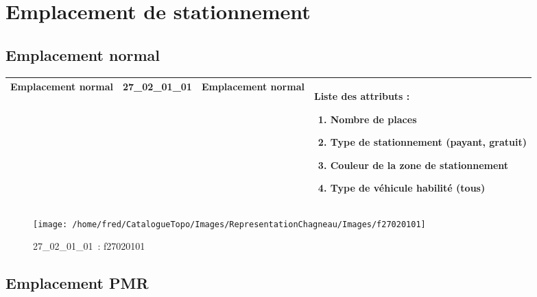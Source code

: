 \documentclass[12pt,titlepage]{book}
\begin{document}
\section{\large Emplacement de stationnement}
\subsection{Emplacement normal}
\noindent
\vspace{\baselineskip}

\renewcommand{\arraystretch}{1.2}
\begin{supertabular}{|p{10cm}|c|p{13cm}|p{12cm}|}
 Emplacement normal & 27\_02\_01\_01 & Emplacement normal & Liste des attributs :
\begin{enumerate}
  \item Nombre de places  \item Type de stationnement (payant, gratuit)  \item Couleur de la zone de stationnement  \item Type de véhicule habilité (tous)\end{enumerate}
\\
\hline
\end{supertabular}
\begin{figure}[h!]
  \hfill         %
  \begin{minipage}[t]{3cm}
    \begin{center}
      \texttt{[image: /home/fred/CatalogueTopo/Images/RepresentationChagneau/Images/f27020101]}
      \caption[~27\_02\_01\_01]{\small{27\_02\_01\_01~:} \tiny{f27020101}}\label{f27020101}
    \end{center}
  \end{minipage}
\end{figure}


\subsection{Emplacement PMR}
\noindent
\vspace{\baselineskip}
\end{document}
